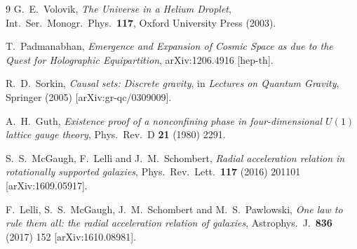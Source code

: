 \documentclass[11pt]{article}
\begin{document}
\begin{thebibliography}{9}
G.~E.~Volovik,
\emph{The Universe in a Helium Droplet},
Int.\ Ser.\ Monogr.\ Phys.\ \textbf{117}, Oxford University Press
(2003).

T.~Padmanabhan,
\emph{Emergence and Expansion of Cosmic Space as due to the Quest
for Holographic Equipartition},
arXiv:1206.4916 [hep-th].

R.~D.~Sorkin,
\emph{Causal sets: Discrete gravity},
in \emph{Lectures on Quantum Gravity}, Springer (2005)
[arXiv:gr-qc/0309009].

A.~H.~Guth,
\emph{Existence proof of a nonconfining phase in four-dimensional
$U(1)$ lattice gauge theory},
Phys.\ Rev.\ D \textbf{21} (1980) 2291.

S.~S.~McGaugh, F.~Lelli and J.~M.~Schombert,
\emph{Radial acceleration relation in rotationally supported
galaxies},
Phys.\ Rev.\ Lett.\ \textbf{117} (2016) 201101
[arXiv:1609.05917].

F.~Lelli, S.~S.~McGaugh, J.~M.~Schombert and M.~S.~Pawlowski,
\emph{One law to rule them all: the radial acceleration relation of
galaxies},
Astrophys.\ J.\ \textbf{836} (2017) 152
[arXiv:1610.08981].

\end{thebibliography}
\end{document}
